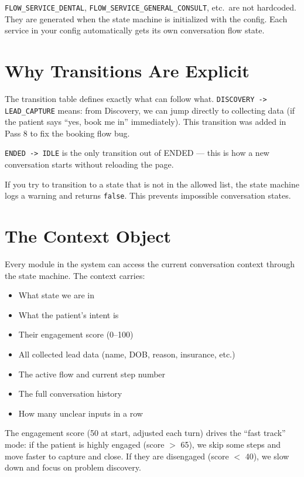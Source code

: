 \documentclass[12pt, a4paper]{report}
\newcommand{\ic}[1]{\texttt{\small\color{accentblue!70!black}#1}}
\begin{document}
\ic{FLOW\_SERVICE\_DENTAL}, \ic{FLOW\_SERVICE\_GENERAL\_CONSULT}, etc.\ are not
hardcoded. They are generated when the state machine is initialized with the config. Each
service in your config automatically gets its own conversation flow state.

\section{Why Transitions Are Explicit}

The transition table defines exactly what can follow what.
\ic{DISCOVERY -> LEAD\_CAPTURE} means: from Discovery, we can jump directly to
collecting data (if the patient says ``yes, book me in'' immediately). This transition
was added in Pass 8 to fix the booking flow bug.

\ic{ENDED -> IDLE} is the only transition out of ENDED --- this is how a new
conversation starts without reloading the page.

If you try to transition to a state that is not in the allowed list, the state machine
logs a warning and returns \ic{false}. This prevents impossible conversation states.

\section{The Context Object}

Every module in the system can access the current conversation context through the state
machine. The context carries:

\begin{itemize}
  \item What state we are in
  \item What the patient's intent is
  \item Their engagement score (0--100)
  \item All collected lead data (name, DOB, reason, insurance, etc.)
  \item The active flow and current step number
  \item The full conversation history
  \item How many unclear inputs in a row
\end{itemize}

The engagement score (50 at start, adjusted each turn) drives the ``fast track'' mode:
if the patient is highly engaged (score $>$ 65), we skip some steps and move faster to
capture and close. If they are disengaged (score $<$ 40), we slow down and focus on
problem discovery.
\end{document}
